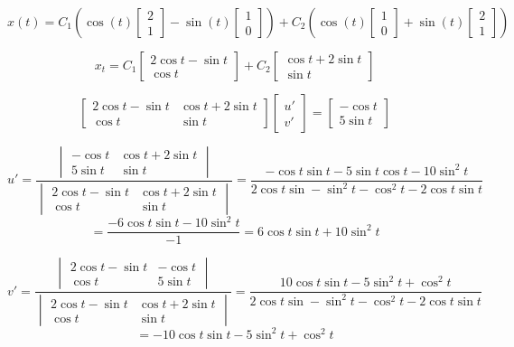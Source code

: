 \documentclass[12pt]{article}
\begin{document}
\[x(t) = C_1 \left(\cos(t) \begin{bmatrix}
    2\\1
\end{bmatrix} - \sin(t) \begin{bmatrix}
    1\\0
\end{bmatrix}\right) + C_2 \left(\cos(t) \begin{bmatrix}
    1\\0
\end{bmatrix} + \sin(t) \begin{bmatrix}
    2\\1
\end{bmatrix}\right)\]

\[x_t = C_1 \begin{bmatrix}
    2 \cos t - \sin t\\
    \cos t
\end{bmatrix} + C_2 \begin{bmatrix}
    \cos t + 2 \sin t\\
    \sin t
\end{bmatrix}\]

\[\begin{bmatrix}
    2 \cos t - \sin t & \cos t + 2 \sin t\\
    \cos t & \sin t
\end{bmatrix} \begin{bmatrix}
    u'\\
    v'
\end{bmatrix} = \begin{bmatrix}
    -\cos t\\
    5 \sin t
\end{bmatrix}\]

\[u' = \frac{\begin{vmatrix}
    - \cos t & \cos t + 2 \sin t\\
    5 \sin t & \sin t
\end{vmatrix}}{\begin{vmatrix}
    2 \cos t - \sin t & \cos t + 2 \sin t\\
    \cos t & \sin t
\end{vmatrix}} = \frac{-\cos t \sin t - 5\sin t \cos t - 10 \sin^2 t}{2 \cos t \sin - \sin^2 t - \cos^2 t - 2\cos t \sin t} \] 
\[= \frac{-6 \cos t \sin t - 10\sin^2 t}{-1} = 6 \cos t \sin t + 10\sin^2 t\]

\[v' = \frac{\begin{vmatrix}
    2 \cos t - \sin t & - \cos t\\
    \cos t & 5\sin t
\end{vmatrix}}{\begin{vmatrix}
    2 \cos t - \sin t & \cos t + 2 \sin t\\
    \cos t & \sin t
\end{vmatrix}} = \frac{10\cos t \sin t- 5 \sin^2 t + \cos^2 t}{2 \cos t \sin - \sin^2 t - \cos^2 t - 2\cos t \sin t} \]
\[= - 10 \cos t \sin t - 5\sin^2 t + \cos^2 t\]
\end{document}
